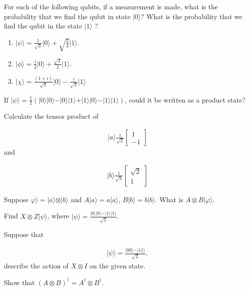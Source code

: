 \documentclass{article}
\begin{document}
\begin{exercise}[subtitle = Mathematics of Quantum States]

    \begin{tasks}

   

\task For each of the following qubits, if a measurement is made, what is the probability that we find the qubit in state $\vert 0\rangle$? What is the probability that we find the qubit in the state $\vert 1\rangle$ ?


\begin{enumerate}
    \item $\vert \psi\rangle = \frac{1}{\sqrt{3}}\vert 0\rangle +  \sqrt{\frac{2}{3}}\vert 1\rangle$.
    \item $\vert  \phi \rangle = \frac{i}{2} \vert 0\rangle + \frac{\sqrt{3}}{2}\vert 1\rangle $.
    \item $\vert \chi \rangle = \frac{(1+i)}{\sqrt{3}} \vert 0\rangle - \frac{i}{\sqrt{3}} \vert 1\rangle$
\end{enumerate}


\task If $\vert \psi \rangle=\frac{1}{2} (\vert 0\rangle \vert 0\rangle - \vert 0\rangle\vert 1\rangle +\vert 1\rangle \vert 0\rangle - \vert 1\rangle  \vert 1\rangle)$, could it be written as a product state?


\task Calculate the tensor product of


\begin{align*}
    \vert a\rangle \frac{1}{\sqrt{2}}\begin{bmatrix}
        1 \\ -1
    \end{bmatrix}
\end{align*}
and

\begin{align*}
    \vert b\rangle \frac{1}{\sqrt{3}}\begin{bmatrix}
        \sqrt{2} \\ 1
    \end{bmatrix}
\end{align*}


\task Suppose $\varphi\rangle =\vert a\rangle \otimes \vert b\rangle $ and $A\vert a\rangle = a\vert a\rangle$, $B\vert b\rangle = b\vert b\rangle$. What is $A\otimes B\vert \varphi\rangle$.


\task Find $X\otimes Z\vert \psi\rangle$, where $\vert \psi\rangle = \frac{\vert 0\rangle \vert 0\rangle - \vert 1\rangle \vert 1\rangle}{\sqrt{2}}$.



\task Suppose that

\begin{align*}
    \vert \psi \rangle = \frac{\vert 00\rangle - \vert 11\rangle}{\sqrt{2}},
\end{align*}
describe the action of $X\otimes I$ on the given state.


\task Show that $(A\otimes B)^\dagger = A^\dagger \otimes B^\dagger$.


\end{tasks}
\end{exercise}
\end{document}
